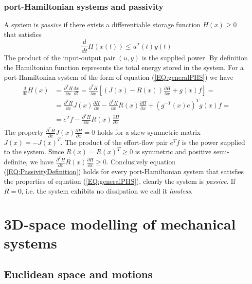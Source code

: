 \documentclass[a4paper,twoside, openright,12pt]{report}
\begin{document}
\subsubsection{port-Hamiltonian systems and passivity}
A system is \emph{passive} if there exists a differentiable storage function $H(x) \geq 0$ that satisfies 
\begin{equation}\label{EQ:PassivityDefinition}
\frac{d}{dt}H(x(t)) \leq u^T(t)y(t)
\end{equation}
The product of the input-output pair $(u,y)$ is the supplied power. By definition the Hamiltonian function represents the total energy stored in the system. For a port-Hamiltonian system of the form of equation (\ref{EQ:generalPHS}) we have
\begin{eqnarray}
\begin{aligned}
\frac{d}{dt}H(x) &= \frac{\partial^T H}{\partial x} \frac{dx}{dt} = \frac{\partial^T H}{\partial x}\left[(J(x)-R(x))\frac{\partial H}{\partial x} + g(x)f\right] = \\
&= \frac{\partial^T H}{\partial x}J(x)\frac{\partial H}{\partial x} - \frac{\partial^T H}{\partial x}R(x)\frac{\partial H}{\partial x} + (g^{-T}(x)e)^T g(x)f = \\
&= e^Tf - \frac{\partial^T H}{\partial x}R(x)\frac{\partial H}{\partial x}
\end{aligned}
\end{eqnarray}
The property $\frac{\partial^T H}{\partial x}J(x)\frac{\partial H}{\partial x}=0$ holds for a skew symmetric matrix $J(x) = -J(x)^T$. The product of the effort-flow pair $e^Tf$ is the power supplied to the system. Since $R(x)=R(x)^T \geq 0$ is symmetric and positive semi-definite, we have $\frac{\partial^T H}{\partial x}R(x)\frac{\partial H}{\partial x} \geq 0$. Conclusively equation (\ref{EQ:PassivityDefinition}) holds for every port-Hamiltonian system that satisfies the properties of equation (\ref{EQ:generalPHS}), clearly the system is \emph{passive}. If $R=0$, i.e. the system exhibits no dissipation we call it \emph{lossless}.  
\section{3D-space modelling of mechanical systems}\label{S:3Dspace-modelling}


\subsection{Euclidean space and motions}\label{[SS:euclideanspacemotions]}
\end{document}

